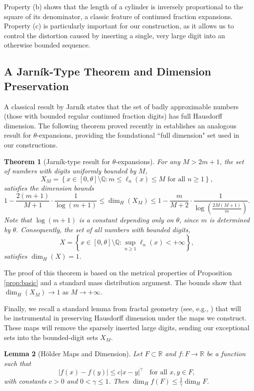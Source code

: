 \documentclass{article}
\newtheorem{theorem}{Theorem}[section]
\newtheorem{lemma}[theorem]{Lemma}
\numberwithin{equation}{section}
\begin{document}
Property (b) shows that the length of a cylinder is inversely proportional to the square of its denominator, a classic feature of continued fraction expansions. Property (c) is particularly important for our construction, as it allows us to control the distortion caused by inserting a single, very large digit into an otherwise bounded sequence.

\subsection{A Jarník-Type Theorem and Dimension Preservation}

A classical result by Jarník states that the set of badly approximable numbers (those with bounded regular continued fraction digits) has full Hausdorff dimension. The following theorem proved recently in \cite{SebeLascuBilel2} establishes an analogous result for $\theta$-expansions, providing the foundational ``full dimension" set used in our constructions.

\begin{theorem}[Jarník-type result for $\theta$-expansions]\label{thm:jarnik}
For any $M > 2m+1$, the set of numbers with digits uniformly bounded by $M$,
\[
X_M = \left\{ x \in [0, \theta] \setminus \mathbb{Q} : m \leq \ell_n(x) \leq M \text{ for all } n \geq 1 \right\},
\]
satisfies the dimension bounds
\[
1 - \frac{2(m+1)}{M+1} \cdot \frac{1}{\log(m+1)} \leq \dim_H (X_M) \leq 1 - \frac{m}{M+2} \cdot \frac{1}{\log \left( \frac{2M(M+1)}{m} \right)}.
\]
{Note that $\log(m+1)$ is a constant depending only on $\theta$, since $m$ is determined by $\theta$.}
Consequently, the set of all numbers with bounded digits,
\[
X = \left\{ x \in [0, \theta] \setminus \mathbb{Q} : \sup_{n \geq 1} \ell_n(x) < +\infty \right\},
\]
satisfies $\dim_H(X) = 1$.
\end{theorem}

The proof of this theorem is based on the metrical properties of Proposition \ref{prop:basic} and a standard mass distribution argument. The bounds show that $\dim_H (X_M) \to 1$ as $M \to +\infty$.

Finally, we recall a standard lemma from fractal geometry {(see, e.g., \cite{Falconer})} that will be instrumental in preserving Hausdorff dimension under the maps we construct. These maps will remove the sparsely inserted large digits, sending our exceptional sets into the bounded-digit sets $X_M$.

\begin{lemma}[Hölder Maps and Dimension]\label{lem:holder}
Let $F \subset \mathbb{R}$ and $f: F \to \mathbb{R}$ be a function such that
\[
|f(x)-f(y)| \leq c|x-y|^\gamma \quad \text{for all } x, y \in F,
\]
with constants $c > 0$ and $0 < \gamma \leq 1$. Then $\dim_H f(F) \leq \frac{1}{\gamma} \dim_H F$.
\end{lemma}
\end{document}
